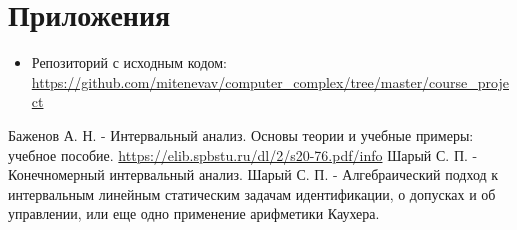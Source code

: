 \documentclass{article}
\begin{document}
     
    
\newpage

\section{Приложения}
    \begin{itemize}
        \item Репозиторий с исходным кодом: \url{https://github.com/mitenevav/computer_complex/tree/master/course_project}
    \end{itemize}
   
\vspace{4cm} 
    
 
\begin{thebibliography}{}
      Баженов А. Н.  -  Интервальный анализ. Основы теории и учебные примеры: учебное пособие.  \url{https://elib.spbstu.ru/dl/2/s20-76.pdf/info}
      Шарый С. П.  -  Конечномерный интервальный анализ.
      Шарый С. П.  -  Алгебраический подход к интервальным линейным статическим задачам идентификации, о допусках и об управлении, или еще одно применение арифметики Каухера.
\end{thebibliography}
\end{document}
